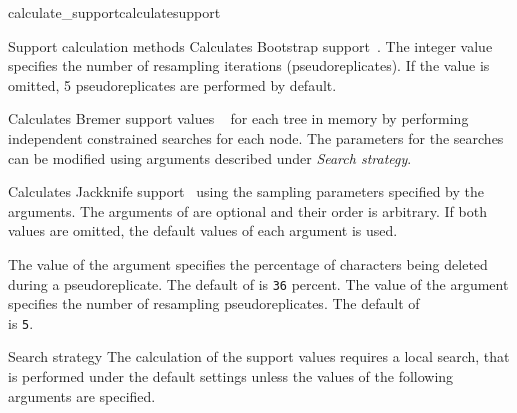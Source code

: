 \begin{command}{calculate\_support}{calculatesupport}
\begin{arguments}
\begin{argumentgroup}{Support calculation methods}
                {Calculates Bootstrap support~\cite{Felsenstein1985}. 
                The integer value specifies
                the number of resampling iterations (pseudoreplicates). If the value
                is omitted, 5 pseudoreplicates are performed by default.} 
                {}
                
                {Calculates Bremer support values ~\cite{Bremer1988, Kallersjoetal1992}
                for each tree in memory by performing independent constrained searches for each
                node. The parameters for the searches can be modified using arguments
                described under \emph{Search strategy}.} 
                {}
  
                {Calculates Jackknife support~\cite{Farrisetal1996} using the 
                sampling parameters specified by the arguments. The arguments of
                 are optional and their order is arbitrary. If
                both values are omitted, the default values of each argument is used.}
                {}
        
              	        
                \begin{description}
                        {The value of the argument  specifies the
                        percentage of characters being deleted during a pseudoreplicate. The
                        default of  is \texttt{36} percent.}
                        {}
                        {The value of the argument  specifies the
                        number of resampling pseudoreplicates. The default of \\
                         is \texttt{5}.}
                        {}
               \end{description}  
		\end{argumentgroup}

        \begin{argumentgroup}{Search strategy}
            {The calculation of the support values requires a local search,
            that is performed under the default settings unless the values
            of the following arguments are specified.}
		 

\end{argumentgroup}
\end{arguments}
\end{command}

